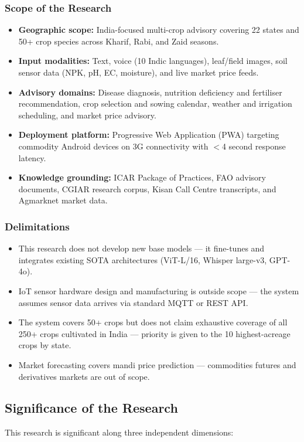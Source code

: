 \documentclass[12pt,a4paper]{article}
\begin{document}
\subsubsection{Scope of the Research}
\begin{itemize}
    \item \textbf{Geographic scope:} India-focused multi-crop advisory covering 22 states and 50+ crop species across Kharif, Rabi, and Zaid seasons.
    \item \textbf{Input modalities:} Text, voice (10 Indic languages), leaf/field images, soil sensor data (NPK, pH, EC, moisture), and live market price feeds.
    \item \textbf{Advisory domains:} Disease diagnosis, nutrition deficiency and fertiliser recommendation, crop selection and sowing calendar, weather and irrigation scheduling, and market price advisory.
    \item \textbf{Deployment platform:} Progressive Web Application (PWA) targeting commodity Android devices on 3G connectivity with $<$4 second response latency.
    \item \textbf{Knowledge grounding:} ICAR Package of Practices, FAO advisory documents, CGIAR research corpus, Kisan Call Centre transcripts, and Agmarknet market data.
\end{itemize}

\subsubsection{Delimitations}
\begin{itemize}
    \item This research does not develop new base models --- it fine-tunes and integrates existing SOTA architectures (ViT-L/16, Whisper large-v3, GPT-4o).
    \item IoT sensor hardware design and manufacturing is outside scope --- the system assumes sensor data arrives via standard MQTT or REST API.
    \item The system covers 50+ crops but does not claim exhaustive coverage of all 250+ crops cultivated in India --- priority is given to the 10 highest-acreage crops by state.
    \item Market forecasting covers mandi price prediction --- commodities futures and derivatives markets are out of scope.
\end{itemize}

\subsection{Significance of the Research}
This research is significant along three independent dimensions:
\end{document}
